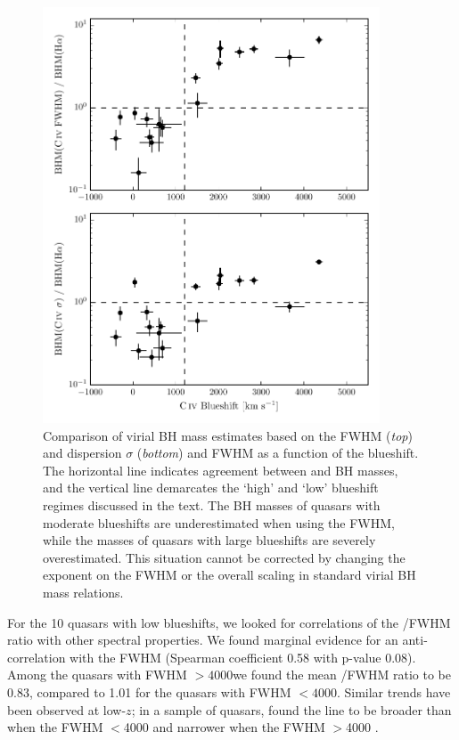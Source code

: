 \begin{figure}
	\includegraphics[width=10cm]{figures/chapter02/bs_bhm.pdf}
    \caption{Comparison of virial BH mass estimates based on the  FWHM ({\it top}) and dispersion $\sigma$ ({\it bottom}) and \ha FWHM as a function of the  blueshift. The horizontal line indicates agreement between  and \ha BH masses, and the vertical line demarcates the `high' and `low'  blueshift regimes discussed in the text. The BH masses of quasars with moderate  blueshifts are underestimated when using the  FWHM, while the masses of quasars with large blueshifts are severely overestimated. This situation cannot be corrected by changing the exponent on the FWHM \citep[e.g.][]{rafiee11,park13} or the overall scaling in standard virial BH mass relations.}
    \label{fig:bhm_blueshift}
\end{figure}

For the 10 quasars with low  blueshifts, we looked for correlations of the /\ha FWHM ratio with other spectral properties.
We found marginal evidence for an anti-correlation with the \ha FWHM (Spearman coefficient 0.58 with p-value 0.08). 
Among the quasars with \ha FWHM $>4000$\kms we found the mean /\ha FWHM ratio to be 0.83, compared to 1.01 for the quasars with \ha FWHM $<4000$\kms.  
Similar trends have been observed at low-$z$; in a sample of \citet{boroson92} quasars, \citet{baskin05} found the  line to be broader than \hb when the \hb FWHM $<$4000 \kms and narrower when the \hb FWHM $>$4000 \kms. 

